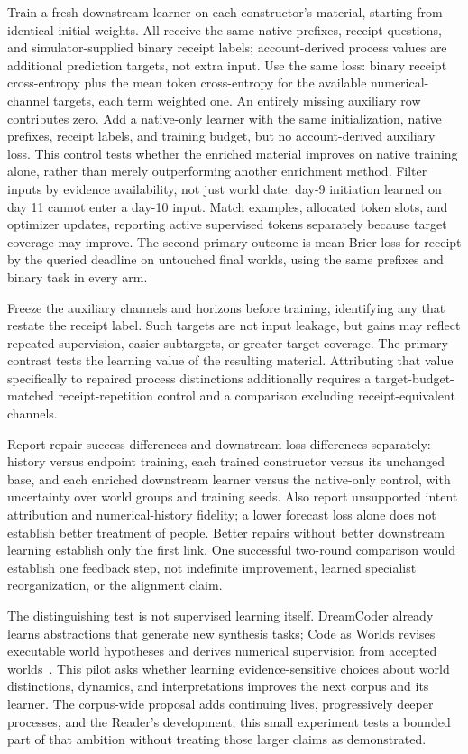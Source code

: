 \documentclass[10pt]{article}
\begin{document}
Train a fresh downstream learner on each constructor's material, starting from
identical initial weights. All receive
the same native prefixes, receipt questions, and simulator-supplied binary
receipt labels; account-derived process values are additional prediction
targets, not extra input. Use the same loss: binary receipt cross-entropy plus
the mean token cross-entropy for the available numerical-channel targets,
each term weighted one. An entirely missing auxiliary row contributes zero.
Add a native-only learner with the same initialization, native prefixes,
receipt labels, and training budget, but no account-derived auxiliary loss.
This control tests whether the enriched material improves on native training
alone, rather than merely outperforming another enrichment method.
Filter inputs by evidence availability, not just world date: day-9 initiation
learned on day 11 cannot enter a day-10 input. Match examples, allocated token
slots, and optimizer updates, reporting active supervised tokens separately
because target coverage may improve. The second primary outcome is mean Brier
loss for receipt by the queried deadline on untouched final worlds, using
the same prefixes and binary task in every arm.

Freeze the auxiliary channels and horizons before training, identifying any
that restate the receipt label. Such targets are not input leakage, but gains
may reflect repeated supervision, easier subtargets, or greater target
coverage. The primary contrast tests the learning value of the resulting
material. Attributing that value specifically to repaired process distinctions
additionally requires a target-budget-matched receipt-repetition control and
a comparison excluding receipt-equivalent channels.

Report repair-success differences and downstream loss differences separately:
history versus endpoint training, each trained constructor versus its unchanged
base, and each enriched downstream learner versus the native-only control,
with uncertainty over world groups and training seeds. Also report unsupported
intent attribution and numerical-history fidelity; a lower forecast loss
alone does not establish better treatment of people. Better repairs without
better downstream learning establish only the first link. One successful
two-round comparison would establish one feedback step, not indefinite
improvement, learned specialist reorganization, or the alignment claim.

The distinguishing test is not supervised learning itself. DreamCoder already
learns abstractions that generate new synthesis tasks; Code as Worlds revises
executable world hypotheses and derives numerical supervision from accepted
worlds~\cite{ellis2021dreamcoder,wang2026codeAsWorlds}. This pilot asks whether
learning evidence-sensitive choices about world distinctions, dynamics, and
interpretations improves the next corpus and its learner. The corpus-wide
proposal adds continuing lives, progressively deeper processes, and the
Reader's development; this small experiment tests a bounded part of that
ambition without treating those larger claims as demonstrated.
\end{document}
